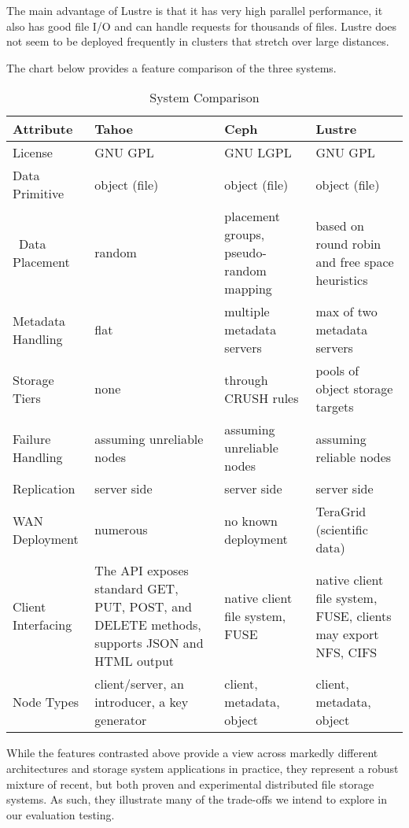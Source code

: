 \documentclass[11pt]{article}
\begin{document}
The main advantage of Lustre is that it has very high parallel 
performance, it also has good file I/O and can handle requests for 
thousands of files. Lustre does not seem to be deployed frequently 
in clusters that stretch over large distances.

The chart below provides a feature comparison of the three systems.

\begin{table}
  \begin{center}
    \begin{tabular}{
        | p{} | p{} | p{} | p{} |
      }
      \hline
      Attribute & Tahoe & Ceph & Lustre \\ \hline
      License & GNU GPL & GNU LGPL & GNU GPL \\ \hline
      Data Primitive & object (file) & object (file) &
      object (file) \\ \hline\
      Data Placement & random & placement groups, pseudo-random mapping &   
      based on round robin and free space heuristics \\ \hline
      Metadata Handling & flat & multiple metadata servers & 
      max of two  metadata servers  \\ \hline
      Storage Tiers & none & through CRUSH rules & pools of object storage
      targets \\ \hline
      Failure Handling & assuming unreliable nodes & assuming unreliable
      nodes & assuming reliable nodes \\ \hline
      Replication & server side & server side & server side \\ \hline
      WAN Deployment & numerous & no known deployment & TeraGrid (scientific
      data) \\ \hline
      Client Interfacing &  The API exposes standard GET, PUT, POST, and
      DELETE methods, supports JSON and HTML output & native client file
      system, FUSE & native client file system, FUSE, clients may export
      NFS, CIFS \\ \hline
      Node Types & client/server, an introducer, a key generator & client,
      metadata, object & client, metadata, object \\ \hline
    \end{tabular}
    \caption{System Comparison}
    \label{tbl:syscomp}
  \end{center}
\end{table}

While the features contrasted above provide a view across markedly different 
architectures and storage system applications in practice, they represent a 
robust mixture of recent, but both proven and experimental distributed file 
storage systems. As such, they illustrate many of the trade-offs we intend 
to explore in our evaluation testing.
\end{document}
